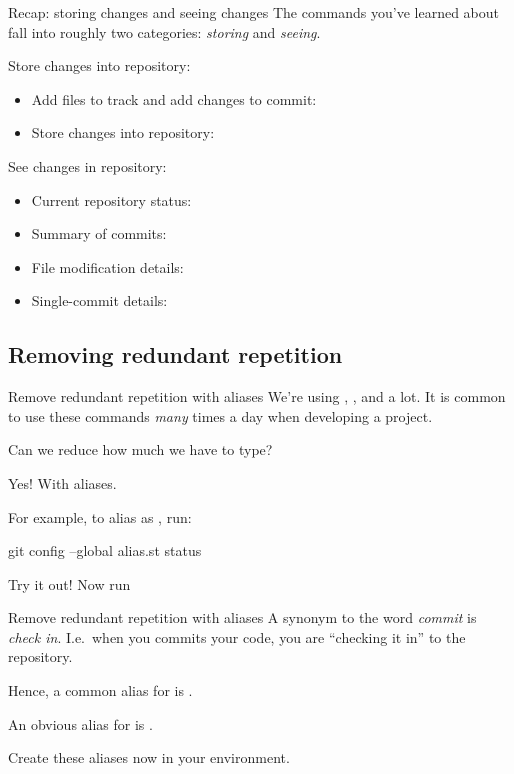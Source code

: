 \begin{frame}[fragile]{Recap: storing changes and seeing changes}
    The commands you've learned about fall into roughly two categories:
    \emph{storing} and \emph{seeing}.

    Store changes into repository:
    \begin{itemize}
        \item Add files to track and add changes to commit: 
        \item Store changes into repository: 
    \end{itemize}

    See changes in repository:
    \begin{itemize}
        \item Current repository status: 
        \item Summary of commits: 
        \item File modification details: 
        \item Single-commit details: 
    \end{itemize}
\end{frame}

\subsection{Removing redundant repetition}

\begin{frame}[fragile]{Remove redundant repetition with aliases}
    We're using , , and  a lot.  It is
    common to use these commands \emph{many} times a day when developing a
    project.

    Can we reduce how much we have to type?

    Yes!  With aliases.

    For example, to alias  as , run:
    \begin{shellcode}
        git config --global alias.st status
    \end{shellcode}

    Try it out!  Now run 
\end{frame}

\begin{frame}[fragile]{Remove redundant repetition with aliases}
    A synonym to the word \emph{commit} is \emph{check in}.  I.e.\ when you
    commits your code, you are ``checking it in'' to the repository.

    Hence, a common alias for  is .

    An obvious alias for  is .

    Create these aliases now in your environment.
\end{frame}

